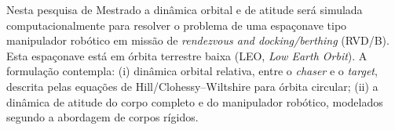 
Nesta pesquisa de Mestrado a dinâmica orbital e de atitude será simulada computacionalmente para resolver o problema de uma espaçonave tipo manipulador robótico em missão de \emph{rendezvous and docking/berthing} (RVD/B).
Esta espaçonave está em órbita terrestre baixa (LEO, \emph{Low Earth Orbit}).
A formulação contempla:
(i) dinâmica orbital relativa, entre o \emph{chaser} e o \emph{target}, descrita pelas equações de Hill/Clohessy--Wiltshire para órbita circular;
(ii) a dinâmica de atitude do corpo completo e do manipulador robótico, modelados segundo a abordagem de corpos rígidos.


